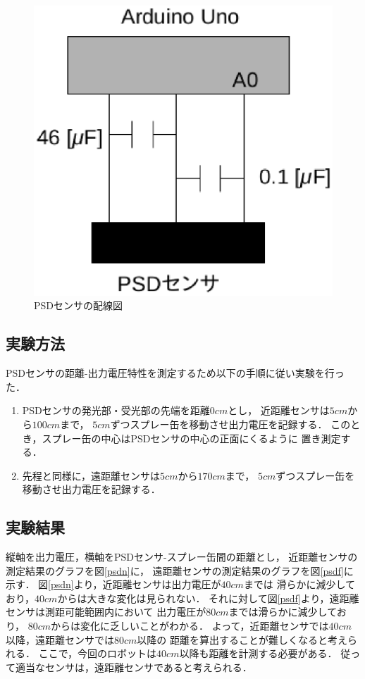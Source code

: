 \documentclass[11pt,a4]{jsarticle}
\begin{document}
\begin{figure}
 \begin{center}
  \includegraphics[scale = 0.8]{picture/psdwd.eps}
  \caption{PSDセンサの配線図}
  \label{psdwd}
 \end{center}
\end{figure}


\newpage
\subsection{実験方法}
PSDセンサの距離-出力電圧特性を測定するため以下の手順に従い実験を行った．
\begin{enumerate}
 \item PSDセンサの発光部・受光部の先端を距離$0\unit{cm}$とし，
       近距離センサは$5\unit{cm}$から$100\unit{cm}$まで，
       $5\unit{cm}$ずつスプレー缶を移動させ出力電圧を記録する．
       このとき，スプレー缶の中心はPSDセンサの中心の正面にくるように
       置き測定する．
 \item 先程と同様に，遠距離センサは$5\unit{cm}$から$170\unit{cm}$まで，
       $5\unit{cm}$ずつスプレー缶を移動させ出力電圧を記録する．
\end{enumerate}

\subsection{実験結果}
縦軸を出力電圧，横軸をPSDセンサ-スプレー缶間の距離とし，
近距離センサの測定結果のグラフを図\ref{psdn}に，
遠距離センサの測定結果のグラフを図\ref{psdf}に示す．
図\ref{psdn}より，近距離センサは出力電圧が$40\unit{cm}$までは
滑らかに減少しており，$40\unit{cm}$からは大きな変化は見られない．
それに対して図\ref{psdf}より，遠距離センサは測距可能範囲内において
出力電圧が$80\unit{cm}$までは滑らかに減少しており，
$80\unit{cm}$からは変化に乏しいことがわかる．
よって，近距離センサでは$40\unit{cm}$以降，遠距離センサでは$80\unit{cm}$以降の
距離を算出することが難しくなると考えられる．
ここで，今回のロボットは$40\unit{cm}$以降も距離を計測する必要がある．
従って適当なセンサは，遠距離センサであると考えられる．
\end{document}
